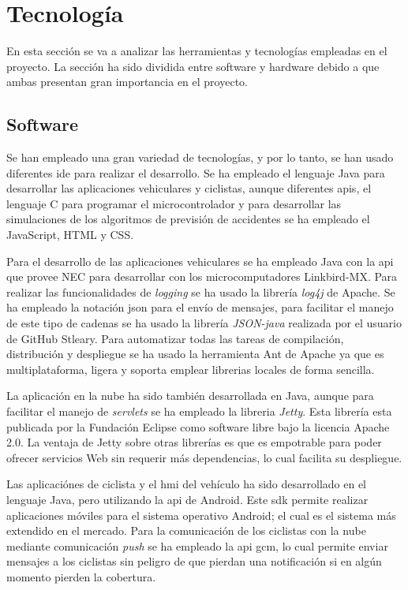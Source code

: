 \section{Tecnología}
En esta sección se va a analizar las herramientas y tecnologías empleadas en
el proyecto. La sección ha sido dividida entre software y hardware debido a que
ambas presentan gran importancia en el proyecto.

\subsection{Software}
Se han empleado una gran variedad de tecnologías, y por lo tanto, se han usado
diferentes \gls{ide} para realizar el desarrollo. Se ha empleado el lenguaje
Java para desarrollar las aplicaciones vehiculares y ciclistas, aunque
diferentes \gls{api}s, el lenguaje C para programar el microcontrolador y
para desarrollar las simulaciones de los algoritmos de previsión de accidentes
se ha empleado el JavaScript, HTML y CSS.

Para el desarrollo de las aplicaciones vehiculares se ha empleado Java con la
\gls{api} que provee NEC para desarrollar con los microcomputadores
Linkbird-MX. Para realizar las funcionalidades de \emph{logging} se ha usado
la librería \emph{log4j} de Apache. Se ha empleado la notación \gls{json} para
el envío de mensajes, para facilitar el manejo de este tipo de cadenas se ha
usado la librería \emph{JSON-java} realizada por el usuario de GitHub
Stleary. Para automatizar todas las tareas de compilación, distribución y
despliegue se ha usado la herramienta Ant de Apache ya que es multiplataforma,
ligera y soporta emplear librerias locales de forma sencilla.

La aplicación en la nube ha sido también desarrollada en Java, aunque para
facilitar el manejo de \emph{servlets} se ha empleado la libreria \emph{Jetty}.
Esta librería esta publicada por la Fundación Eclipse como software libre
bajo la licencia Apache 2.0. La ventaja de Jetty sobre otras librerías es que
es empotrable para poder ofrecer servicios Web sin requerir más dependencias,
lo cual facilita su despliegue.

Las aplicaciónes de ciclista y el \gls{hmi} del vehículo ha sido desarrollado
en el lenguaje Java, pero utilizando la \gls{api} de Android. Este \gls{sdk}
permite realizar aplicaciones móviles para el sistema operativo Android; el
cual es el sistema más extendido en el mercado. Para la comunicación de los
ciclistas con la nube mediante comunicación \emph{push} se ha empleado la
\gls{api} \gls{gcm}, lo cual permite enviar mensajes a los ciclistas sin
peligro de que pierdan una notificación si en algún momento pierden la
cobertura.

